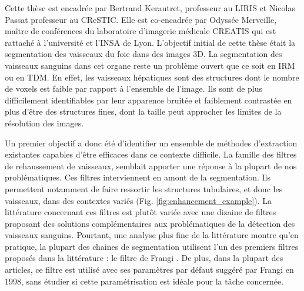 Cette thèse est encadrée par Bertrand Kerautret, professeur au LIRIS et Nicolas Passat professeur au CReSTIC. Elle est co-encadrée par Odyssée Merveille, maître de conférences du laboratoire d'imagerie médicale CREATIS qui  est rattaché à l'université et l'INSA de Lyon. L'objectif initial de cette thèse était la segmentation des vaisseaux du foie dans des images 3D. La segmentation des vaisseaux sanguins dans cet organe reste un problème ouvert que ce soit en IRM ou en TDM. En effet, les vaisseaux hépatiques sont des structures dont le nombre de voxels est faible par rapport à l'ensemble de l'image. Ils sont de plus difficilement identifiables par leur apparence bruitée et faiblement contrastée en plus d'être des structures fines, dont la taille peut approcher les limites de la résolution des images.

Un premier objectif a donc été d'identifier un ensemble de méthodes d'extraction existantes capables d'être efficaces dans ce contexte difficile. La famille des filtres de rehaussement de vaisseaux, semblait apporter une réponse à la plupart de nos problématiques. Ces filtres interviennent en amont de la segmentation. Ils permettent notamment de faire ressortir les structures tubulaires, et donc les vaisseaux, dans des contextes variés (Fig. \ref{fig:enhancement_example}). La littérature concernant ces filtres est plutôt variée avec une dizaine de filtres proposant des solutions complémentaires aux problématiques de la détection des vaisseaux sanguins. Pourtant, une analyse plus fine de la littérature montre qu'en pratique, la plupart des chaines de segmentation utilisent l'un des premiers filtres proposés dans la littérature : le filtre de Frangi \cite{Frangi1998_vesselness}. De plus, dans la plupart des articles, ce filtre est utilisé avec ses paramètres par défaut suggéré par Frangi en 1998, sans étudier si cette paramétrisation est idéale pour la tâche concernée.

